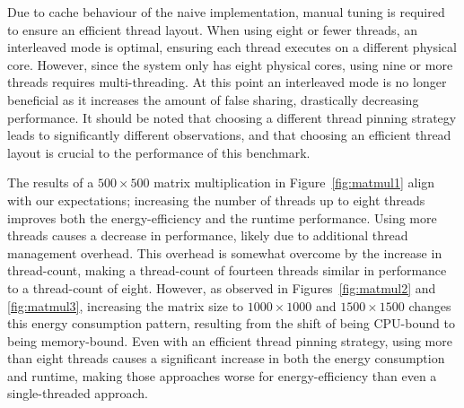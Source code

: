 Due to cache behaviour of the naive implementation, manual tuning is required to ensure an efficient thread layout.
When using eight or fewer threads, an interleaved mode is optimal, ensuring each thread executes on a different physical core.
However, since the system only has eight physical cores, using nine or more threads requires multi-threading.
At this point an interleaved mode is no longer beneficial as it increases the amount of false sharing, drastically decreasing performance.
It should be noted that choosing a different thread pinning strategy leads to significantly different observations, and that choosing an efficient thread layout is crucial to the performance of this benchmark.

The results of a $500 \times 500$ matrix multiplication in Figure~\ref{fig:matmul1} align with our expectations; increasing the number of threads up to eight threads improves both the energy-efficiency and the runtime performance.
Using more threads causes a decrease in performance, likely due to additional thread management overhead.
This overhead is somewhat overcome by the increase in thread-count, making a thread-count of fourteen threads similar in performance to a thread-count of eight.
However, as observed in Figures~\ref{fig:matmul2} and \ref{fig:matmul3}, increasing the matrix size to $1000 \times 1000$ and $1500 \times 1500$ changes this energy consumption pattern, resulting from the shift of being CPU-bound to being memory-bound.
Even with an efficient thread pinning strategy, using more than eight threads causes a significant increase in both the energy consumption and runtime, making those approaches worse for energy-efficiency than even a single-threaded approach.

